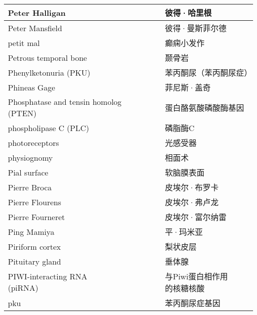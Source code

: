 \begin{longtable}{lll}
	\midrule
	Peter Halligan     && 彼得·哈里根   \\
	
	\midrule
	Peter Mansfield     && 彼得·曼斯菲尔德   \\
	
	\midrule
	petit mal     && 癫痫小发作   \\
	
	\midrule
	Petrous temporal bone     && 颞骨岩   \\
	
	\midrule
	Phenylketonuria (PKU)    &&  苯丙酮尿（苯丙酮尿症）   \\
	
	\midrule
	Phineas Gage     && 菲尼斯·盖奇   \\
	
	\midrule
	Phosphatase and tensin homolog (PTEN)    && 蛋白酪氨酸磷酸酶基因   \\
	
	\midrule
	phospholipase C (PLC)     && 磷脂酶C   \\
	
	\midrule
	photoreceptors     && 光感受器   \\
	
	\midrule
	physiognomy     && 相面术   \\
	
	\midrule
	Pial surface     && 软脑膜表面   \\
	
	\midrule
	Pierre Broca     && 皮埃尔·布罗卡   \\
	
	\midrule
	Pierre Flourens     && 皮埃尔·弗卢龙   \\
	
	\midrule
	Pierre Fourneret     && 皮埃尔·富尔纳雷   \\
	
	\midrule
	Ping Mamiya     && 平·玛米亚   \\
	
	\midrule
	Piriform cortex     && 梨状皮层   \\
	
	\midrule
	Pituitary gland     && 垂体腺   \\
	
	\midrule
	\makecell{PIWI-interacting RNA \\ (piRNA) }  && \makecell{与Piwi蛋白相作用\\的核糖核酸}   \\
	
	\midrule
	pku   && 苯丙酮尿症基因   \\
	

\end{longtable}
